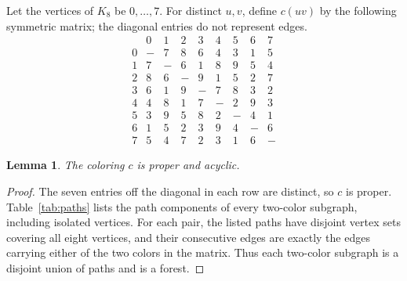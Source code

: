 \documentclass[11pt]{article}
\newtheorem{lemma}{Lemma}
\begin{document}
Let the vertices of \(K_8\) be \(0,\ldots,7\).
For distinct \(u,v\), define \(c(uv)\) by the following symmetric
matrix; the diagonal entries do not represent edges.
\[
\begin{array}{c|rrrrrrrr}
 &0&1&2&3&4&5&6&7\\ \hline
0&-&7&8&6&4&3&1&5\\
1&7&-&6&1&8&9&5&4\\
2&8&6&-&9&1&5&2&7\\
3&6&1&9&-&7&8&3&2\\
4&4&8&1&7&-&2&9&3\\
5&3&9&5&8&2&-&4&1\\
6&1&5&2&3&9&4&-&6\\
7&5&4&7&2&3&1&6&-
\end{array}
\]

\begin{lemma}\label{lem:acyclic}
The coloring \(c\) is proper and acyclic.
\end{lemma}

\begin{proof}
The seven entries off the diagonal in each row are distinct,
so \(c\) is proper.
Table~\ref{tab:paths} lists the path components of every two-color
subgraph, including isolated vertices.
For each pair, the listed paths have disjoint vertex sets covering
all eight vertices, and their consecutive edges are exactly the
edges carrying either of the two colors in the matrix.
Thus each two-color subgraph is a disjoint union of paths and
is a forest.
\end{proof}
\end{document}
